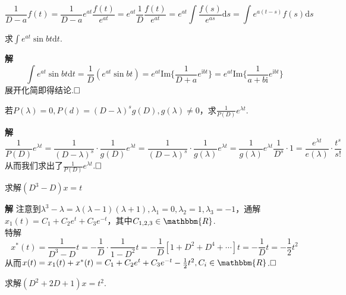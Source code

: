 \documentclass{ctexart}
\newenvironment{custom}[1]{\par\noindent \textbf{#1}\quad}{\par\vspace{1em}}
\begin{document}
\begin{example}
$$\frac{1}{D-a}f(t)=\frac{1}{D-a}e^{at}\frac{f(t)}{e^{at}}=e^{at}\frac{1}{D}\frac{f(t)}{e^{at}}=e^{at}\int{\frac{f(s)}{e^{as}}\mathrm{d}s}=\int{e^{a(t-s)}f(s)\mathrm{d}s}$$
\end{example}

\begin{example}
求$\int{e^{at}\sin{bt}\mathrm{d}t}$.
\end{example}

\begin{custom}{解}
$$\int{e^{at}\sin{bt}\mathrm{d}t}=\frac{1}{D}\left(e^{at}\sin{bt}\right)=e^{at}\mathrm{Im}\{\frac{1}{D+a}e^{\mathrm{i}bt}\}=e^{at}\mathrm{Im}\{\frac{1}{a+b\mathrm{i}}e^{\mathrm{i}bt}\}$$
展开化简即得结论.$\hfill{\square}$
\end{custom}

\begin{example}
若$P(\lambda)=0,P(d)=(D-\lambda)^{s}g(D),g(\lambda)\neq 0$，求$\frac{1}{P(D)}e^{\lambda t}$.
\end{example}

\begin{custom}{解}
$$\frac{1}{P(D)}e^{\lambda t}=\frac{1}{(D-\lambda)^{s}}\cdot\frac{1}{g(D)}e^{\lambda t}=\frac{1}{(D-\lambda)^{s}}\cdot\frac{1}{g(\lambda)}e^{\lambda t}=\frac{1}{g(\lambda)}e^{\lambda t}\frac{1}{D^{s}}\cdot 1=\frac{e^{\lambda t}}{e(\lambda)}\cdot\frac{t^{s}}{s!}$$
从而我们求出了$\frac{1}{P(D)}e^{\lambda t}$.$\hfill{\square}$
\end{custom}

\begin{example}
求解$(D^{3}-D)x=t$
\end{example}

\begin{custom}{解}
注意到$\lambda^{3}-\lambda=\lambda(\lambda-1)(\lambda+1),\lambda_{1}=0,\lambda_{2}=1,\lambda_{3}=-1$，通解$x_{1}(t)=C_{1}+C_{2}e^{t}+C_{3}e^{-t}$，其中$C_{1,2,3}\in\mathbbm{R}$.\\
特解
$$x^{*}(t)=\frac{1}{D^{3}-D}t=-\frac{1}{D}\cdot\frac{1}{1-D^{2}}t=-\frac{1}{D}[1+D^{2}+D^{4}+\cdots]t=-\frac{1}{D}t=-\frac{1}{2}t^{2}$$
从而$x(t)=x_{1}(t)+x^{*}(t)=C_{1}+C_{2}e^{t}+C_{3}e^{-t}-\frac{1}{2}t^{2},C_{i}\in\mathbbm{R}$.$\hfill{\square}$
\end{custom}

\begin{example}
求解$(D^{2}+2D+1)x=t^{2}$.
\end{example}
\end{document}
